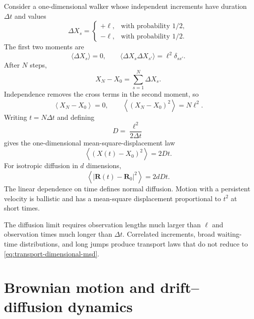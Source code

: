 Consider a one-dimensional walker whose independent increments have duration
$\Delta t$ and values
\begin{equation}
  \Delta X_s=
  \begin{cases}
    +\ell,&\text{with probability }1/2,\\
    -\ell,&\text{with probability }1/2.
  \end{cases}
  \label{eq:transport-random-step}
\end{equation}
The first two moments are
\begin{equation}
  \langle\Delta X_s\rangle=0,
  \qquad
  \langle\Delta X_s\Delta X_{s'}\rangle
  =\ell^2\delta_{ss'}.
  \label{eq:transport-step-moments}
\end{equation}
After $N$ steps,
\begin{equation}
  X_N-X_0=\sum_{s=1}^{N}\Delta X_s.
  \label{eq:transport-position-sum}
\end{equation}
Independence removes the cross terms in the second moment, so
\begin{equation}
  \left\langle X_N-X_0\right\rangle=0,
  \qquad
  \left\langle(X_N-X_0)^2\right\rangle=N\ell^2.
  \label{eq:transport-random-walk-msd}
\end{equation}
Writing $t=N\Delta t$ and defining
\begin{equation}
  D=\frac{\ell^2}{2\Delta t}
  \label{eq:transport-random-walk-diffusivity}
\end{equation}
gives the one-dimensional mean-square-displacement law
\begin{equation}
  \boxed{\left\langle(X(t)-X_0)^2\right\rangle=2Dt.}
  \label{eq:transport-one-dimensional-msd}
\end{equation}
For isotropic diffusion in $d$ dimensions,
\begin{equation}
  \boxed{
  \left\langle|\bm R(t)-\bm R_0|^2\right\rangle=2dDt.
  }
  \label{eq:transport-dimensional-msd}
\end{equation}
The linear dependence on time defines normal diffusion.  Motion with a
persistent velocity is ballistic and has a mean-square displacement
proportional to $t^2$ at short times.

The diffusion limit requires observation lengths much larger than $\ell$ and
observation times much longer than $\Delta t$.  Correlated increments, broad
waiting-time distributions, and long jumps produce transport laws that do not
reduce to \cref{eq:transport-dimensional-msd}.

\section{Brownian motion and drift--diffusion dynamics}


